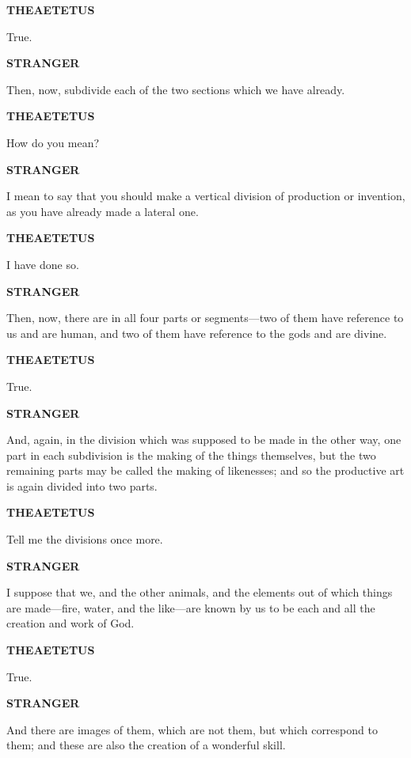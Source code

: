 \documentclass[11pt,letter]{article}
\begin{document}
\par \textbf{THEAETETUS}
\par   True.

\par \textbf{STRANGER}
\par   Then, now, subdivide each of the two sections which we have already.

\par \textbf{THEAETETUS}
\par   How do you mean?

\par \textbf{STRANGER}
\par   I mean to say that you should make a vertical division of production or invention, as you have already made a lateral one.

\par \textbf{THEAETETUS}
\par   I have done so.

\par \textbf{STRANGER}
\par   Then, now, there are in all four parts or segments—two of them have reference to us and are human, and two of them have reference to the gods and are divine.

\par \textbf{THEAETETUS}
\par   True.

\par \textbf{STRANGER}
\par   And, again, in the division which was supposed to be made in the other way, one part in each subdivision is the making of the things themselves, but the two remaining parts may be called the making of likenesses; and so the productive art is again divided into two parts.

\par \textbf{THEAETETUS}
\par   Tell me the divisions once more.

\par \textbf{STRANGER}
\par   I suppose that we, and the other animals, and the elements out of which things are made—fire, water, and the like—are known by us to be each and all the creation and work of God.

\par \textbf{THEAETETUS}
\par   True.

\par \textbf{STRANGER}
\par   And there are images of them, which are not them, but which correspond to them; and these are also the creation of a wonderful skill.
\end{document}
